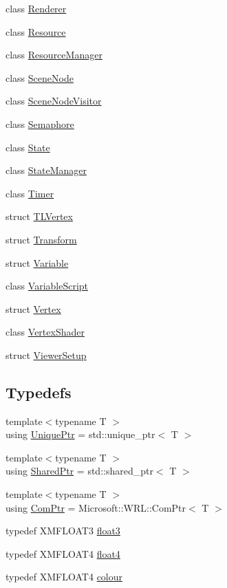 \begin{DoxyCompactItemize}
\item 
class \hyperlink{classmage_1_1_renderer}{Renderer}
\item 
class \hyperlink{classmage_1_1_resource}{Resource}
\item 
class \hyperlink{classmage_1_1_resource_manager}{Resource\+Manager}
\item 
class \hyperlink{classmage_1_1_scene_node}{Scene\+Node}
\item 
class \hyperlink{classmage_1_1_scene_node_visitor}{Scene\+Node\+Visitor}
\item 
class \hyperlink{classmage_1_1_semaphore}{Semaphore}
\item 
class \hyperlink{classmage_1_1_state}{State}
\item 
class \hyperlink{classmage_1_1_state_manager}{State\+Manager}
\item 
class \hyperlink{classmage_1_1_timer}{Timer}
\item 
struct \hyperlink{structmage_1_1_t_l_vertex}{T\+L\+Vertex}
\item 
struct \hyperlink{structmage_1_1_transform}{Transform}
\item 
struct \hyperlink{structmage_1_1_variable}{Variable}
\item 
class \hyperlink{classmage_1_1_variable_script}{Variable\+Script}
\item 
struct \hyperlink{structmage_1_1_vertex}{Vertex}
\item 
class \hyperlink{classmage_1_1_vertex_shader}{Vertex\+Shader}
\item 
struct \hyperlink{structmage_1_1_viewer_setup}{Viewer\+Setup}
\end{DoxyCompactItemize}
\subsection*{Typedefs}
\begin{DoxyCompactItemize}
\item 
{\footnotesize template$<$typename T $>$ }\\using \hyperlink{namespacemage_a8c307fbcc33bce9b7f2aa4c26c3b95cf}{Unique\+Ptr} = std\+::unique\+\_\+ptr$<$ T $>$
\item 
{\footnotesize template$<$typename T $>$ }\\using \hyperlink{namespacemage_a1e01ae66713838a7a67d30e44c67703e}{Shared\+Ptr} = std\+::shared\+\_\+ptr$<$ T $>$
\item 
{\footnotesize template$<$typename T $>$ }\\using \hyperlink{namespacemage_ae74f374780900893caa5555d1031fd79}{Com\+Ptr} = Microsoft\+::\+W\+R\+L\+::\+Com\+Ptr$<$ T $>$
\item 
typedef X\+M\+F\+L\+O\+A\+T3 \hyperlink{namespacemage_aab5dae4b0aaf8129b9e0d651d91d4b38}{float3}
\item 
typedef X\+M\+F\+L\+O\+A\+T4 \hyperlink{namespacemage_aa79484ea5211c29727b3794199ac0a55}{float4}
\item 
typedef X\+M\+F\+L\+O\+A\+T4 \hyperlink{namespacemage_a2d4dece8fe175b32167f9a7b925adc7c}{colour}
\end{DoxyCompactItemize}
